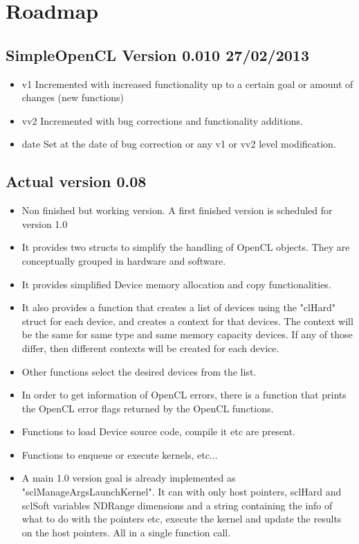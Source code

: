 \documentclass{report}
\begin{document}
\chapter{Roadmap}

\section{SimpleOpenCL Version 0.010 27/02/2013}

\begin{itemize}
\item v1 Incremented with increased functionality up to a certain goal or amount of changes (new functions)
\item vv2 Incremented with bug corrections and functionality additions.
\item date Set at the date of bug correction or any v1 or vv2 level modification.
\end{itemize}


\section{Actual version 0.08}

\begin{itemize}
  \item Non finished but working version. A first finished version is scheduled for version 1.0
  \item It provides two structs to simplify the handling of OpenCL objects. They are conceptually grouped in hardware and software.
  \item It provides simplified Device memory allocation and copy functionalities.
  \item It also provides a function that creates a list of devices using the "clHard" struct for each device, and creates a context for that devices. The context will be the same for same type and same memory capacity devices. If any of those differ, then different contexts will be created for each device.
  \item Other functions select the desired devices from the list.
  \item In order to get information of OpenCL errors, there is a function that prints the OpenCL error flags returned by the OpenCL functions.
  \item Functions to load Device source code, compile it etc are present.
  \item Functions to enqueue or execute kernels, etc...
  \item A main 1.0 version goal is already implemented as "sclManageArgsLaunchKernel". It can with only host pointers, sclHard and sclSoft variables NDRange dimensions and a string containing the info of what to do with the pointers etc, execute the kernel and update the results on the host pointers. All in a single function call.   
\end{itemize}
\end{document}
